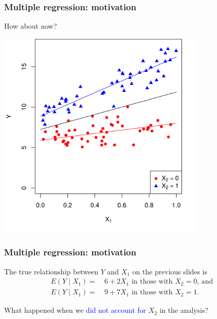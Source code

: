 \documentclass[12pt, 
hyperref={colorlinks=true, linkcolor=blue, urlcolor=cyan}]{beamer}
\begin{document}
\begin{frame}
\frametitle{Multiple regression: motivation}
How about now?

\centering
\includegraphics[width=0.75\textwidth]{plots/effect_modification_colored_with_lines.png}

\end{frame}

\begin{frame}
\frametitle{Multiple regression: motivation}
The true relationship between $Y$ and $X_1$ on the previous slides is 
\begin{align*}
E(Y \mid X_1) =& \ 6 + 2 X_1 \text{ in those with $X_2 = 0$, and } \\
E(Y \mid X_1) =& \ 9 + 7 X_1 \text{ in those with $X_2 = 1$}.
\end{align*}

What happened when we \textcolor{blue}{did not account for} $X_2$ in the analysis? 
\end{frame}
\end{document}
